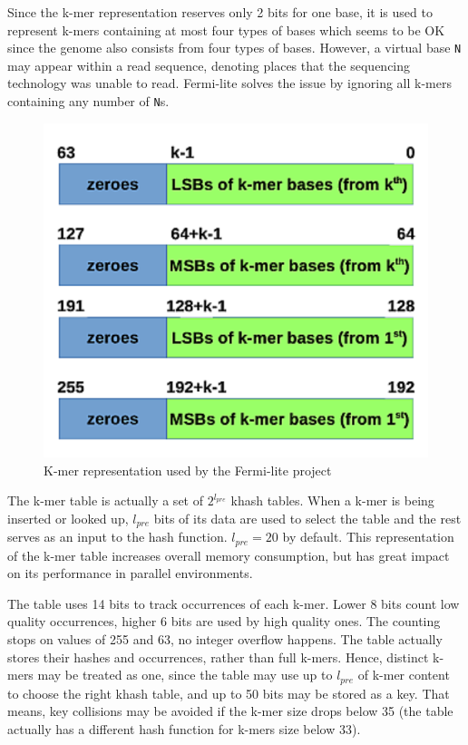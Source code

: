 Since the k-mer representation reserves only 2 bits for one base, it is used to represent k-mers containing at most four types of bases which seems to be OK since the genome also consists from four types of bases. However, a virtual base \texttt{N} may appear within a read sequence, denoting places that the sequencing technology was unable to read. Fermi-lite solves the issue by ignoring all k-mers containing any number of \texttt{N}s.

\begin{figure}[h]
	\centering
	\includegraphics{img/fermi-kmer-structure.pdf}
	\caption{K-mer representation used by the Fermi-lite project}
	\label{fig:fermi-kmer-structure}
\end{figure}

The k-mer table is actually a set of $2^{l_{pre}}$ khash tables. When a k-mer is being inserted or looked up, $l_{pre}$ bits of its data are used to select the table and the rest serves as an input to the hash function. $l_{pre} = 20$ by default. This representation of the k-mer table increases overall memory consumption, but has great impact on its performance in parallel environments. 

The table uses 14 bits to track occurrences of each k-mer. Lower 8 bits count low quality occurrences, higher 6 bits are used by high quality ones. The counting stops on values of 255 and 63, no integer overflow happens. The table actually stores their hashes and occurrences, rather than full k-mers. Hence, distinct k-mers may be treated as one, since the table may use up to $l_{pre}$ of k-mer content to choose the right khash table, and up to 50 bits may be stored as a key. That means, key collisions may be avoided if the k-mer size drops below 35 (the table actually has a different hash function for k-mers size below 33).

